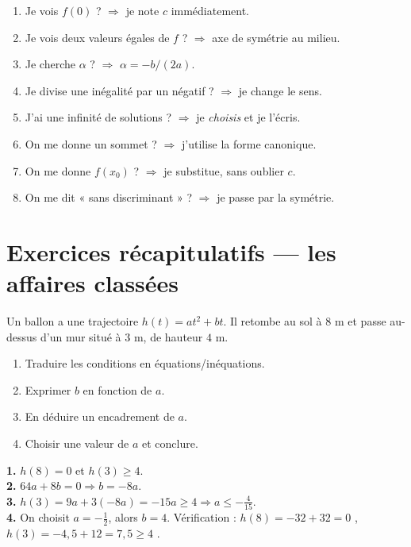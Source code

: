 \documentclass[11pt,a4paper]{article}
\begin{document}
\begin{methode}[Mémo]
\begin{enumerate}[leftmargin=*]
  \item Je vois $f(0)$ ? $\Rightarrow$ je note $c$ immédiatement.
  \item Je vois deux valeurs égales de $f$ ? $\Rightarrow$ axe de symétrie au milieu.
  \item Je cherche $\alpha$ ? $\Rightarrow$ $\alpha = -b/(2a)$.
  \item Je divise une inégalité par un négatif ? $\Rightarrow$ je change le sens.
  \item J'ai une infinité de solutions ? $\Rightarrow$ je \emph{choisis} et je l'écris.
  \item On me donne un sommet ? $\Rightarrow$ j'utilise la forme canonique.
  \item On me donne $f(x_0)$ ? $\Rightarrow$ je substitue, sans oublier $c$.
  \item On me dit « sans discriminant » ? $\Rightarrow$ je passe par la symétrie.
\end{enumerate}
\end{methode}

\section{Exercices récapitulatifs — les affaires classées}

\begin{affaire}
Un ballon a une trajectoire $h(t) = at^2+bt$. Il retombe au sol à $8$ m et passe au-dessus d'un mur situé à $3$ m, de hauteur $4$ m.
\begin{enumerate}[leftmargin=*]
  \item Traduire les conditions en équations/inéquations.
  \item Exprimer $b$ en fonction de $a$.
  \item En déduire un encadrement de $a$.
  \item Choisir une valeur de $a$ et conclure.
\end{enumerate}
\end{affaire}

\begin{revelation}
\textbf{1.} $h(8) = 0$ et $h(3) \geq 4$. \\
\textbf{2.} $64a + 8b = 0 \Rightarrow b = -8a$. \\
\textbf{3.} $h(3) = 9a + 3(-8a) = -15a \geq 4 \Rightarrow a \leq -\frac{4}{15}$. \\
\textbf{4.} On choisit $a = -\frac{1}{2}$, alors $b = 4$. Vérification : $h(8) = -32+32 = 0$ \checkmark, $h(3) = -4{,}5+12 = 7{,}5 \geq 4$ \checkmark.
\end{revelation}
\end{document}
